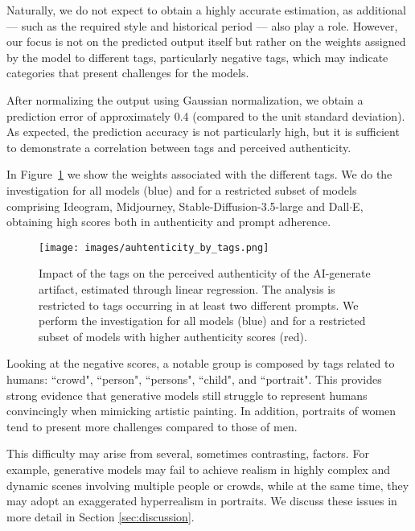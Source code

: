 \documentclass[sn-mathphys]{sn-jnl}
\begin{document}
Naturally, we do not expect to obtain a highly accurate estimation, as additional — such as the required style and historical period — also play a role. However, our focus is not on the predicted output itself but rather on the weights assigned by the model to different tags, particularly negative tags, which may indicate categories that present challenges for the models.

After normalizing the output using Gaussian normalization, we obtain a prediction error of approximately 0.4 (compared to the unit standard deviation). As expected, the prediction accuracy is not particularly high, but it is sufficient to demonstrate a correlation between tags and perceived authenticity. 

In Figure~\ref{fig:tag-weights} we show the weights associated with the different tags. We do the investigation for all models (blue) and for a restricted subset of models comprising Ideogram, Midjourney, Stable-Diffusion-3.5-large and Dall$\cdot$E, obtaining high scores both in authenticity and prompt adherence.

\begin{figure}
    \centering
    \texttt{[image: images/auhtenticity\_by\_tags.png]}
    \caption{Impact of the tags on the perceived authenticity of the AI-generate artifact, estimated through linear regression. The analysis is restricted to tags occurring in at least two different prompts. We perform the investigation for all models (blue) and for 
    a restricted subset of models with higher authenticity 
    scores (red).}
    \label{fig:tag-weights}
\end{figure}

Looking at the negative scores, a notable group is composed
by tags related to humans: ``crowd", ``person", ``persons", ``child", and ``portrait". 
This provides strong evidence that generative models still struggle to represent humans convincingly when mimicking artistic painting. In addition, portraits of women tend to present more challenges compared to those of men.

This difficulty may arise from several, sometimes contrasting, factors. For example, generative models may fail to achieve realism in highly complex and dynamic scenes involving multiple people or crowds, while at the same time, they may adopt an exaggerated hyperrealism in portraits. We discuss these issues in more detail in Section \ref{sec:discussion}.
\end{document}
